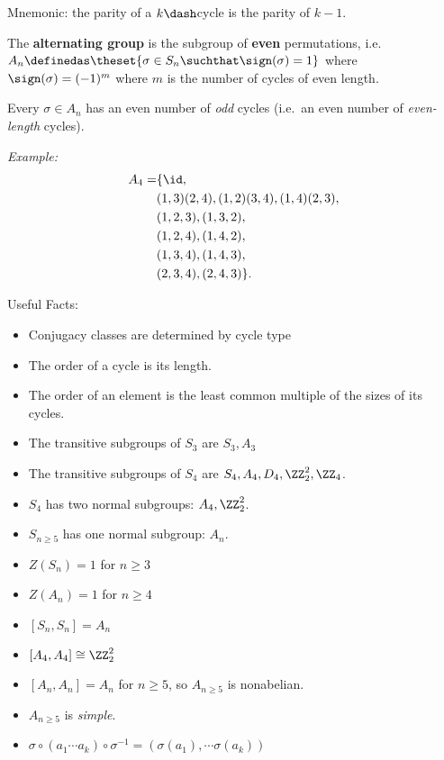 Mnemonic: the parity of a \(k\dash\)cycle is the parity of \(k-1\).

\begin{definition}

The \textbf{alternating group} is the subgroup of \textbf{even}
permutations, i.e.
\(A_n \definedas \theset{\sigma \in S_n \suchthat \sign(\sigma) = 1}\)
where \(\sign(\sigma) = (-1)^{m}\) where \(m\) is the number of cycles
of even length.

\end{definition}

\begin{corollary}

Every \(\sigma \in A_n\) has an even number of \emph{odd} cycles
(i.e.~an even number of \emph{even-length} cycles).

\end{corollary}

\emph{Example:} \begin{align*}
A_4 =
&\{\id, \\
&(1,3)(2,4),
(1,2)(3,4),
(1,4)(2,3), \\
& (1,2,3),
(1,3,2), \\
& (1,2,4),
(1,4,2), \\
& (1,3,4),
(1,4,3), \\
& (2,3,4),
(2,4,3)\}
.\end{align*}

Useful Facts:

\begin{itemize}
\tightlist
\item
  Conjugacy classes are determined by cycle type
\item
  The order of a cycle is its length.
\item
  The order of an element is the least common multiple of the sizes of
  its cycles.
\item
  The transitive subgroups of \(S_3\) are \(S_3, A_3\)
\item
  The transitive subgroups of \(S_4\) are
  \(S_4, A_4, D_4, \ZZ_2^2, \ZZ_4\).
\item
  \(S_4\) has two normal subgroups: \(A_4, \ZZ_2^2\).
\item
  \(S_{n\geq 5}\) has one normal subgroup: \(A_n\).
\item
  \(Z(S_n) = 1\) for \(n\geq 3\)
\item
  \(Z(A_n) = 1\) for \(n\geq 4\)
\item
  \([S_n, S_n] = A_n\)
\item
  \([A_4, A_4] \cong \ZZ_2^2\)
\item
  \([A_n, A_n] = A_n\) for \(n\geq 5\), so \(A_{n\geq 5}\) is
  nonabelian.
\item
  \(A_{n\geq 5}\) is \emph{simple}.
\item
  \(\sigma \circ (a_1 \cdots a_k)\circ \sigma^{-1} = (\sigma(a_1), \cdots \sigma(a_k))\)
\end{itemize}

